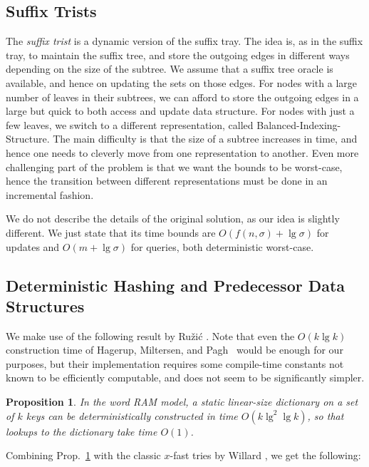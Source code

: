 \documentclass[11pt,onecolumn,final]{article} \usepackage{a4}
\theoremstyle{plain}
\newtheorem{prop}[definition]{Proposition}
\theoremstyle{remark}
\begin{document}
\subsection{Suffix Trists}

The \emph{suffix trist} \cite{cole06suffix} is a dynamic version of the suffix tray. The idea is, as in the suffix tray, to maintain the suffix tree, and store the outgoing edges in different ways depending on the size of the subtree. We assume that a suffix tree oracle is available, and hence on updating the sets on those edges. For nodes with a large number of leaves in their subtrees, we can afford to store the outgoing edges in a large but quick to both access and update data structure. For nodes with just a few leaves, we switch to a different representation, called Balanced-Indexing-Structure. The main difficulty is that the size of a subtree increases in time, and hence one needs to cleverly move from one representation to another. Even more challenging part of the problem is that we want the bounds to be worst-case, hence the transition between different representations must be done in an incremental fashion.

We do not describe the details of the original solution, as our idea is slightly different. We just state that its time bounds are $O(f(n,\sigma)+\lg\sigma)$ for updates and $O(m+\lg\sigma)$ for queries, both deterministic worst-case.

\subsection{Deterministic Hashing and Predecessor Data Structures}
\label{sect:hashing}
We make use of the following result by Ru\v{z}i\'{c} \cite[Theorem~3]{ruzic08constructing}. Note that even the $O(k\lg k)$ construction time of Hagerup, Miltersen, and Pagh~\cite{hagerup01dictionaries} would be enough for our purposes, but their implementation requires some compile-time constants not known to be efficiently computable, and does not seem to be significantly simpler.

\begin{prop}
  \label{thm:hashing}
  In the word RAM model, a static linear-size dictionary on a set of $k$ keys can be deterministically constructed in time $O(k\lg^2\lg k)$, so that lookups to the dictionary take time $O(1)$.
\end{prop}

Combining Prop.~\ref{thm:hashing} with the classic $x$-fast tries by Willard \cite{willard83loglogarithmic}, we get the following:
\end{document}
